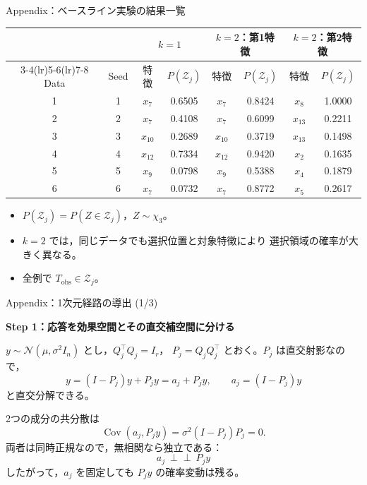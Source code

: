 \documentclass[aspectratio=169,11pt]{beamer}
\begin{document}
\begin{frame}{Appendix：ベースライン実験の結果一覧}
  \small
  \centering
  \renewcommand{\arraystretch}{1.18}
  \begin{tabular}{cc cc cc cc}
    \toprule
    & & \multicolumn{2}{c}{$k=1$}
      & \multicolumn{2}{c}{$k=2$：第1特徴}
      & \multicolumn{2}{c}{$k=2$：第2特徴} \\
    \cmidrule(lr){3-4}\cmidrule(lr){5-6}\cmidrule(lr){7-8}
    Data & Seed
      & 特徴 & $P(\mathcal Z_j)$
      & 特徴 & $P(\mathcal Z_j)$
      & 特徴 & $P(\mathcal Z_j)$ \\
    \midrule
    1 & 1 & $x_7$  & 0.6505 & $x_7$  & 0.8424 & $x_8$  & 1.0000 \\
    2 & 2 & $x_7$  & 0.4108 & $x_7$  & 0.6099 & $x_{13}$ & 0.2211 \\
    3 & 3 & $x_{10}$ & 0.2689 & $x_{10}$ & 0.3719 & $x_{13}$ & 0.1498 \\
    4 & 4 & $x_{12}$ & 0.7334 & $x_{12}$ & 0.9420 & $x_2$  & 0.1635 \\
    5 & 5 & $x_9$  & 0.0798 & $x_9$  & 0.5388 & $x_4$  & 0.1879 \\
    6 & 6 & $x_7$  & 0.0732 & $x_7$  & 0.8772 & $x_5$  & 0.2617 \\
    \bottomrule
  \end{tabular}

  \vspace{0.40cm}
  \begin{itemize}
    \item $P(\mathcal Z_j)=P(Z\in\mathcal Z_j)$，$Z\sim\chi_3$。
    \item $k=2$ では，同じデータでも選択位置と対象特徴により
      選択領域の確率が大きく異なる。
    \item 全例で $T_{\mathrm{obs}}\in\mathcal Z_j$。
  \end{itemize}
\end{frame}

\begin{frame}{Appendix：1次元経路の導出 (1/3)}
  \small
  \setlength{\abovedisplayskip}{5pt}
  \setlength{\belowdisplayskip}{5pt}

  \textbf{Step 1：応答を効果空間とその直交補空間に分ける}

  $y\sim\mathcal N(\mu,\sigma^2I_n)$ とし，$Q_j^\top Q_j=I_r$，
  $P_j=Q_jQ_j^\top$ とおく。$P_j$ は直交射影なので，
  \[
    y=(I-P_j)y+P_jy
      =a_j+P_jy,\qquad a_j=(I-P_j)y
  \]
  と直交分解できる。

  2つの成分の共分散は
  \[
    \operatorname{Cov}(a_j,P_jy)
    =\sigma^2(I-P_j)P_j=0.
  \]
  両者は同時正規なので，無相関なら独立である：
  \[
    \boxed{a_j\ \mathrel{\perp\!\!\!\perp}\ P_jy}
  \]
  したがって，$a_j$ を固定しても $P_jy$ の確率変動は残る。
\end{frame}
\end{document}
